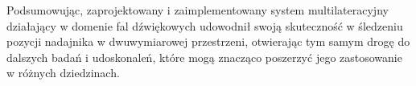 Podsumowując, zaprojektowany i zaimplementowany system multilateracyjny działający w domenie fal dźwiękowych udowodnił swoją skuteczność w śledzeniu pozycji nadajnika w dwuwymiarowej przestrzeni, otwierając tym samym drogę do dalszych badań i udoskonaleń, które mogą znacząco poszerzyć jego zastosowanie w różnych dziedzinach.